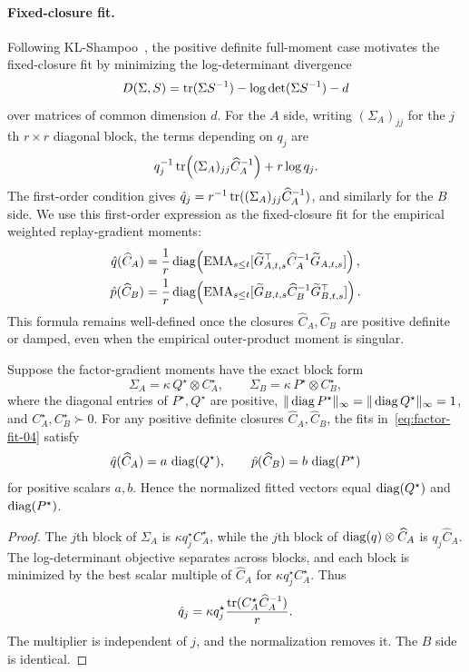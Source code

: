 \paragraph{Fixed-closure fit.}
Following KL-Shampoo~\cite{klshampoo}, the positive definite full-moment case
motivates the fixed-closure fit by minimizing the log-determinant divergence
\[
  D(\Sigma,S)=\operatorname{tr}(\Sigma S^{-1})-\log\det(\Sigma S^{-1})-d
\]
over matrices of common dimension $d$. For the $A$ side, writing
$(\Sigma_A)_{jj}$ for the $j$th $r\times r$ diagonal block, the terms depending
on $q_j$ are
\[
  q_j^{-1}\operatorname{tr}\!\left((\Sigma_A)_{jj}\widehat C_A^{-1}\right)
  +
  r\log q_j .
\]
The first-order condition gives
$\hat q_j=r^{-1}\operatorname{tr}((\Sigma_A)_{jj}\widehat C_A^{-1})$, and similarly for the
$B$ side. We use this first-order expression as the fixed-closure fit for the
empirical weighted replay-gradient moments:
\begin{equation}\label{eq:factor-fit-04}
\begin{aligned}
  \hat q(\widehat C_A)
  &=
  \frac1r\operatorname{diag}\!\left(
    \operatorname{EMA}_{s\leq t}[
      \widetilde G_{A,t,s}^\top
      \widehat C_A^{-1}
      \widetilde G_{A,t,s}]
  \right),
  \\
  \hat p(\widehat C_B)
  &=
  \frac1r\operatorname{diag}\!\left(
    \operatorname{EMA}_{s\leq t}[
      \widetilde G_{B,t,s}
      \widehat C_B^{-1}
      \widetilde G_{B,t,s}^\top]
  \right).
\end{aligned}
\end{equation}
This formula remains well-defined once the closures
$\widehat C_A,\widehat C_B$ are positive definite or damped, even when the
empirical outer-product moment is singular.

\begin{lemma}\label{lem:closure-invariance-04}
Suppose the factor-gradient moments have the exact block form
\[
  \Sigma_A=\kappa\,Q^\star\otimes C^\star_A,
  \qquad
  \Sigma_B=\kappa\,P^\star\otimes C^\star_B,
\]
where the diagonal entries of $P^\star,Q^\star$ are positive,
$\| \operatorname{diag} P^\star\|_\infty=\| \operatorname{diag} Q^\star\|_\infty=1$, and
$C^\star_A,C^\star_B\succ0$. For any positive definite closures
$\widehat C_A,\widehat C_B$, the fits in~\eqref{eq:factor-fit-04} satisfy
\[
  \hat q(\widehat C_A)
  =
  a\,\operatorname{diag}(Q^\star),
  \qquad
  \hat p(\widehat C_B)
  =
  b\,\operatorname{diag}(P^\star)
\]
for positive scalars $a,b$. Hence the normalized fitted vectors equal
$\operatorname{diag}(Q^\star)$ and $\operatorname{diag}(P^\star)$.
\end{lemma}
\begin{proof}
The $j$th block of $\Sigma_A$ is $\kappa q^\star_jC^\star_A$, while the
$j$th block of $\operatorname{diag}(q)\otimes\widehat C_A$ is $q_j\widehat C_A$. The
log-determinant objective separates across blocks, and each block is minimized
by the best scalar multiple of $\widehat C_A$ for
$\kappa q^\star_jC^\star_A$. Thus
\[
  \hat q_j
  =
  \kappa q^\star_j
  \frac{\operatorname{tr}(C^\star_A\widehat C_A^{-1})}{r}.
\]
The multiplier is independent of $j$, and the normalization removes it. The
$B$ side is identical.
\end{proof}

